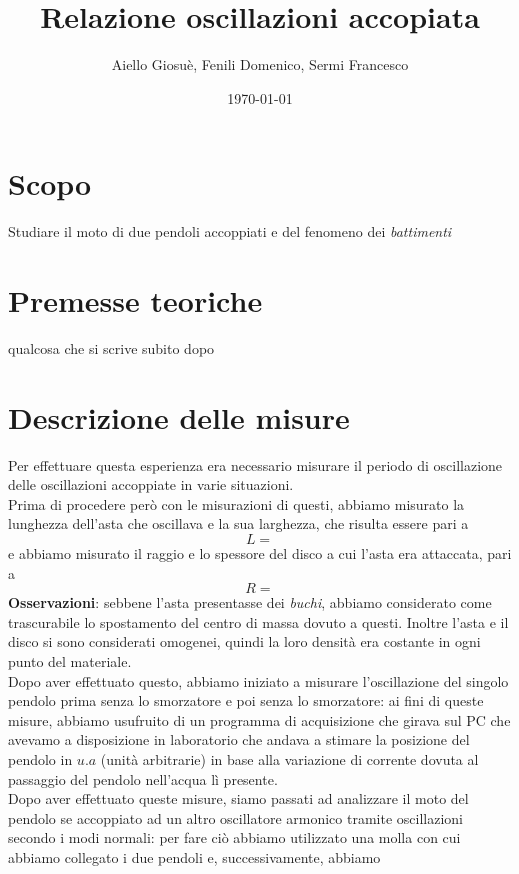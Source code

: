\documentclass{article}
\title{Relazione oscillazioni accopiata}
\author{Aiello Giosuè, Fenili Domenico, Sermi Francesco}
\date{\today}
\begin{document}
\maketitle
\newpage
\tableofcontents
\section{Scopo}
Studiare il moto di due pendoli accoppiati e del fenomeno dei \emph{battimenti}
\section{Premesse teoriche}
qualcosa che si scrive subito dopo

\section{Descrizione delle misure}

Per effettuare questa esperienza era necessario misurare il periodo di oscillazione delle oscillazioni accoppiate
in varie situazioni. \\
Prima di procedere però con le misurazioni di questi, abbiamo misurato la lunghezza dell'asta che oscillava e la sua larghezza, che risulta essere pari a
\begin{equation*}
	L =
\end{equation*}
e abbiamo misurato il raggio e lo spessore del disco a cui l'asta era attaccata, pari a
\begin{equation}
	R = 
\end{equation}
\textbf{Osservazioni}: sebbene l'asta presentasse dei \emph{buchi}, abbiamo considerato come trascurabile lo spostamento del centro di massa dovuto a questi. Inoltre l'asta e il disco si sono considerati omogenei, quindi la loro densità era costante in ogni punto del materiale. \\
Dopo aver effettuato questo, abbiamo iniziato a misurare l'oscillazione del singolo pendolo prima senza lo smorzatore e poi senza lo smorzatore: ai fini di queste misure, abbiamo usufruito di un programma di acquisizione che girava sul PC che avevamo a disposizione in laboratorio che andava a stimare la posizione del pendolo in $u.a$ (unità arbitrarie) in base alla variazione di corrente dovuta al passaggio del pendolo nell'acqua lì presente. \\
Dopo aver effettuato queste misure, siamo passati ad analizzare il moto del pendolo se accoppiato ad un altro oscillatore armonico tramite oscillazioni secondo i modi normali: per fare ciò abbiamo utilizzato una molla con cui abbiamo collegato i due pendoli e, successivamente, abbiamo 
\end{document}
